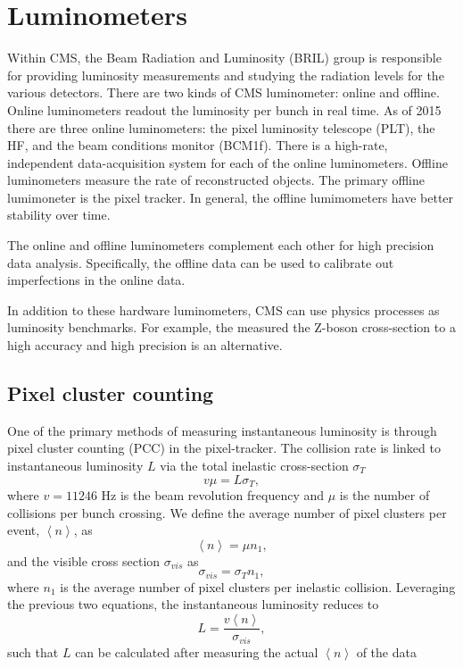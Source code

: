 \section{Luminometers}

Within CMS, the Beam Radiation and Luminosity (BRIL) group is responsible for providing luminosity measurements and studying the radiation levels for the various detectors. There are two kinds of CMS luminometer: online and offline. Online luminometers readout the luminosity per bunch in real time. As of 2015 there are three online luminometers: the pixel luminosity telescope (PLT), the HF, and the beam conditions monitor (BCM1f). There is a high-rate, independent data-acquisition system for each of the online luminometers. Offline luminometers measure the rate of reconstructed objects. The primary offline lumimoneter is the pixel tracker. In general, the offline lumimometers have better stability over time. \cite{CMS:2010gua}

The online and offline luminometers complement each other for high precision data analysis. Specifically, the offline data can be used to calibrate out imperfections in the online data. 

In addition to these hardware luminometers, CMS can use physics processes as luminosity benchmarks.  For example, the measured the Z-boson cross-section to a high accuracy and high precision is an alternative.

\subsection{Pixel cluster counting}

One of the primary methods of measuring instantaneous luminosity is through pixel cluster counting (PCC) in the pixel-tracker. The collision rate is linked to instantaneous luminosity $L$ via the total inelastic cross-section $\sigma_T$
\begin{equation}
v \mu  = L \sigma_T,
\end{equation}
where $v=11246$ Hz is the beam revolution frequency and $\mu$ is the number of collisions per bunch crossing. We define the average number of pixel clusters per event, $\left \langle n \right \rangle$, as
\begin{equation}
\left \langle n \right \rangle = \mu n_1,
\end{equation}
and the visible cross section $\sigma_{vis}$ as 
\begin{equation}
\sigma_{vis} = \sigma_T n_1,
\end{equation}
where $n_1$ is the average number of pixel clusters per inelastic collision. Leveraging the previous two equations, the instantaneous luminosity reduces to
\begin{equation}
L = \frac{v\left \langle n \right \rangle}{\sigma_{vis}},
\end{equation}
such that $L$ can be calculated after measuring the actual $\left \langle n \right \rangle$ of the data \cite{CMS:2013gfa}

